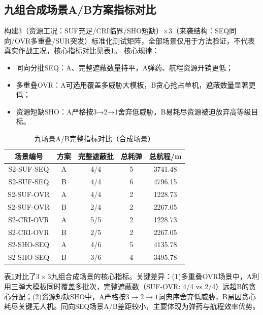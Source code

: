 \documentclass[withoutpreface,bwprint]{cumcmthesis}
\begin{document}
\subsection{九组合成场景A/B方案指标对比}
构建3（资源工况：SUF充足/CRI临界/SHO短缺）$\times$3（来袭结构：SEQ同向/OVR多重叠/SUR突发）标准化测试矩阵，全部场景仅用于方法验证，不代表真实作战工况，核心指标对比见表\ref{tab:regime_comparison}。
核心规律：
\begin{itemize}
	\item 同向分批SEQ：A、完整遮蔽数量持平，A弹药、航程资源开销更低；
	\item 多重叠OVR：A可选用覆盖多威胁大模板，B贪心抢占单机，遮蔽数量显著更低；
	\item 资源短缺SHO：A严格按3→2→1舍弃低威胁，B易耗尽资源被迫放弃高等级目标。
\end{itemize}
\begin{table}[htbp]
	\centering
	\caption{九场景A/B完整指标对比（合成场景）}
	\label{tab:regime_comparison}
	\begin{tabular}{ccccc}
		\toprule
		场景编号 & 方案 & 完整遮蔽批 & 总耗弹 & 总航程/m \\
		\midrule
		S2-SUF-SEQ & A & 4/4 & 5 & 3741.48 \\
		S2-SUF-SEQ & B & 4/4 & 6 & 4796.15 \\
		S2-SUF-OVR & A & 4/4 & 2 & 1228.73 \\
		S2-SUF-OVR & B & 2/4 & 2 & 2267.05 \\
		S2-CRI-OVR & A & 5/5 & 2 & 1228.73 \\
		S2-CRI-OVR & B & 2/5 & 2 & 2267.05 \\
		S2-SHO-SEQ & A & 4/6 & 5 & 4135.78 \\
		S2-SHO-SEQ & B & 3/6 & 4 & 3495.78 \\
		\bottomrule
	\end{tabular}
\end{table}

表\ref{tab:regime_comparison}对比了$3\times3$九组合成场景的核心指标。关键差异：(1)多重叠OVR场景中，A利用三弹大模板同时覆盖多批次，完整遮蔽数（SUF-OVR: 4/4 vs 2/4）远超B的贪心分配；(2)资源短缺SHO中，A严格按$3\to2\to1$词典序舍弃低威胁，B易因贪心耗尽关键无人机。同向SEQ场景A/B差距较小，主要体现为弹药与航程效率优势。
\end{document}
